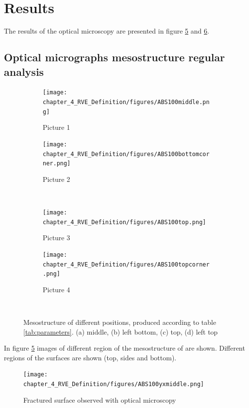 \section{Results}
The results of the optical microscopy are presented in figure \ref{fig:Mesoresults} and \ref{fig:ABS100yxmiddle}. 

\subsection{Optical micrographs mesostructure regular analysis}

\begin{figure}
\centering
  \begin{subfigure}[b]{0.48\textwidth}
  \centering
    \texttt{[image: chapter\_4\_RVE\_Definition/figures/ABS100middle.png]}
    \caption{Picture 1}
    \label{fig:1.0}
  \end{subfigure}
  \begin{subfigure}[b]{0.48\textwidth}
    \texttt{[image: chapter\_4\_RVE\_Definition/figures/ABS100bottomcorner.png]}
    \caption{Picture 2}
    \label{fig:2}
  \end{subfigure}
  \\
    \begin{subfigure}[b]{0.48\textwidth}
    \texttt{[image: chapter\_4\_RVE\_Definition/figures/ABS100top.png]}
    \caption{Picture 3}
    \label{fig:3}
  \end{subfigure}
  \begin{subfigure}[b]{0.48\textwidth}
    \texttt{[image: chapter\_4\_RVE\_Definition/figures/ABS100topcorner.png]}
    \caption{Picture 4}
    \label{fig:4}
  \end{subfigure}
  \\
  
  \caption{Mesostructure of different positions, produced according to table \ref{tab:parameters}. (a) middle, (b) left bottom, (c) top, (d) left top}
    \label{fig:Mesoresults}
\end{figure}

In figure \ref{fig:Mesoresults} images of different region of the mesostructure of are shown. Different regions of the surfaces are shown (top, sides and bottom).

\begin{figure}[H]
    \centering
    \texttt{[image: chapter\_4\_RVE\_Definition/figures/ABS100yxmiddle.png]}
    \caption{Fractured surface observed with optical microscopy}
    \label{fig:ABS100yxmiddle}
\end{figure}

